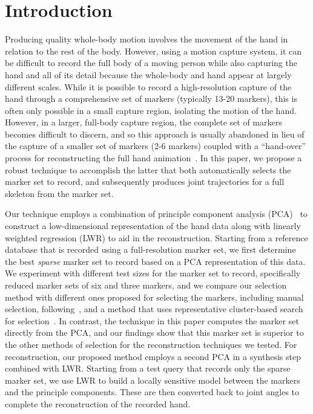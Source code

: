 
\section{Introduction}

Producing quality whole-body motion involves the movement of the hand in relation to the rest of the
body. However, using a motion capture system, it can be difficult to record the full body of a
moving person while also capturing the hand and all of its detail because the whole-body and hand
appear at largely different scales.  While it is possible to record a high-resolution capture of the
hand through a comprehensive set of markers (typically 13-20 markers), this is often only possible
in a small capture region, isolating the motion of the hand.  However, in a larger, full-body
capture region, the complete set of markers becomes difficult to discern, and so this approach is
usually abandoned in lieu of the capture of a smaller set of markers (2-6 markers) coupled with a
``hand-over'' process for reconstructing the full hand animation~\cite{KanWheZor12}.  In this paper,
we propose a robust technique to accomplish the latter that both automatically selects the marker
set to record, and subsequently produces joint trajectories for a full skeleton from the marker set.
 

Our technique employs a combination of principle component analysis (PCA)~\cite{bishopPCA} to
construct a low-dimensional representation of the hand data along with linearly weighted regression
(LWR) to aid in the reconstruction.  Starting from a reference database that is recorded using a
full-resolution marker set, we first determine the best \emph{sparse} marker set to record based on
a PCA representation of this data.  We experiment with different test sizes for the marker set to
record, specifically reduced marker sets of six and three markers, and we compare our selection
method with different ones proposed for selecting the markers, including manual selection,
following~\cite{HoyRyaOSu11}, and a method that uses representative cluster-based search for
selection~\cite{KanWheZor12}. In contrast, the technique in this paper computes the marker set
directly from the PCA, and our findings show that this marker set is superior to the other methods
of selection for the reconstruction techniques we tested.
For reconstruction, our proposed method employs a second PCA in a synthesis step combined with LWR.  
Starting from a test query that records only the sparse marker set, 
we use LWR to build a locally sensitive model between the markers and the principle components.  These
are then converted back to joint angles to complete the reconstruction of the recorded hand.  

